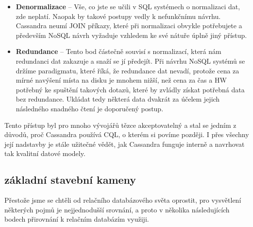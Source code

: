 \begin{itemize}
\item \textbf{Denormalizace} – Vše, co jste se učili v SQL systémech o normalizaci dat, zde neplatí. Naopak by takové postupy vedly k nefunkčnímu návrhu. Cassandra neumí JOIN příkazy, které při normalizaci obvykle potřebujete a především NoSQL návrh vyžaduje vzhledem ke své nátuře úplně jiný přístup. 
\item \textbf{Redundance} – Tento bod částečně souvisí s normalizací, která nám redundanci dat zakazuje a snaží se jí předejít. Při návrhu NoSQL systémů se držíme paradigmatu, které říká, že redundance dat nevadí, protože cena za mírné navýšení místa na disku je mnohem nižší, než cena za čas a HW potřebný ke spuštění takových dotazů, které by zvládly získat potřebná data bez redundance. Ukládat tedy některá data dvakrát za účelem jejich následného snadného čtení je doporučený postup. 
\end{itemize}

Tento přístup byl pro mnoho vývojářů tězce akceptovatelný a stal se jedním z důvodů, proč Cassandra používá CQL, o kterém si povíme později. I přes všechny její nadstavby je stále užitečné vědět, jak Cassandra funguje interně a navrhovat tak kvalitní datové modely. 

\subsection{základní stavební kameny}
Přestože jsme se chtěli od relačního databázového světa oprostit, pro vysvětlení některých pojmů je nejjednodušší srovnání, a proto v několika následujících bodech přirovnání k relačním databázím využiji.

